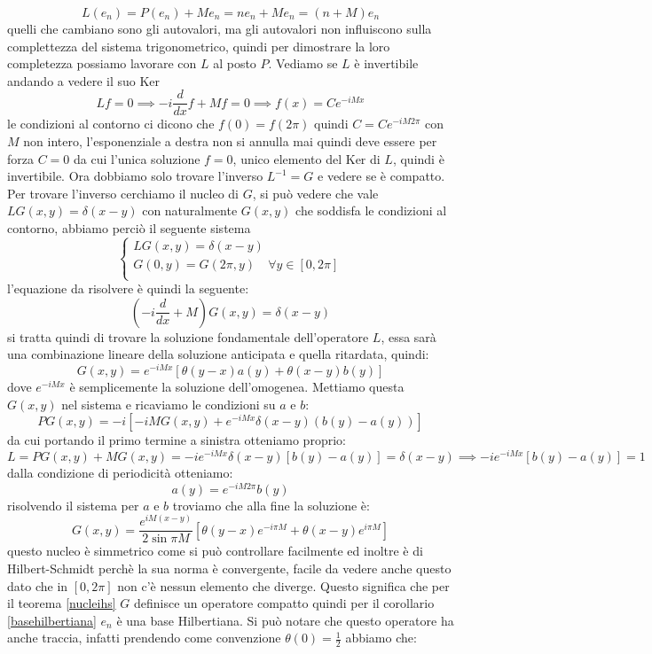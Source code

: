 \documentclass[12pt]{book}
\theoremstyle{plain}
\theoremstyle{definition}
\theoremstyle{remark}
\begin{document}
\[L(e_n) = P(e_n) + Me_n = n e_n +Me_n = (n+M)e_n\]
quelli che cambiano sono gli autovalori, ma gli autovalori non influiscono sulla complettezza del sistema trigonometrico, quindi per dimostrare la loro completezza possiamo lavorare con $L$ al posto $P$. Vediamo se $L$ è invertibile andando a vedere il suo Ker
\[Lf = 0 \implies -i\frac{d}{dx}f+Mf = 0 \implies f(x) = Ce^{-iMx}\]
le condizioni al contorno ci dicono che $f(0)=f(2\pi)$ quindi $C = C e^{-iM2\pi}$ con $M$ non intero, l'esponenziale a destra non si annulla mai quindi deve essere per forza $C=0$ da cui l'unica soluzione $f=0$, unico elemento del Ker di $L$, quindi è invertibile. Ora dobbiamo solo trovare l'inverso $L^{-1} = G$ e vedere se è compatto. Per trovare l'inverso cerchiamo il nucleo di $G$, si può vedere che vale $LG(x,y) = \delta(x-y)$ con naturalmente $G(x,y)$ che soddisfa le condizioni al contorno, abbiamo perciò il seguente sistema
\[ \begin{cases}
    LG(x,y) = \delta(x-y)\\
    G(0,y) = G(2\pi,y) \quad \forall y\in[0,2\pi]\\
  \end{cases}\]
l'equazione da risolvere è quindi la seguente:
\[\left(-i\frac{d}{dx}+M\right)G(x,y) = \delta(x-y)\]
si tratta quindi di trovare la soluzione fondamentale dell'operatore $L$, essa sarà una combinazione lineare della soluzione anticipata e quella ritardata, quindi:
\[G(x,y) = e^{-iM x}[\theta(y-x)a(y) + \theta(x-y)b(y)]\]
dove $e^{-iM x}$ è semplicemente la soluzione dell'omogenea. Mettiamo questa $G(x,y)$ nel sistema e ricaviamo le condizioni su $a$ e $b$:
\[PG(x,y) = -i[-iMG(x,y) + e^{-iMx}\delta(x-y)(b(y)-a(y))]\]
da cui portando il primo termine a sinistra otteniamo proprio:
\[L = PG(x,y) +MG(x,y) = -i e^{-iMx}\delta(x-y)[b(y)-a(y)] = \delta(x-y) \implies -i e^{-iMx}[b(y)-a(y)] = 1\]
dalla condizione di periodicità otteniamo:
\[a(y) = e^{-iM2\pi}b(y)\]
risolvendo il sistema per $a$ e $b$ troviamo che alla fine la soluzione è:
\[G(x,y) = \frac{e^{iM(x-y)}}{2\sin \pi M}[\theta(y-x)e^{-i\pi M} + \theta(x-y)e^{i\pi M}]\]
questo nucleo è simmetrico come si può controllare facilmente ed inoltre è di Hilbert-Schmidt perchè la sua norma è convergente, facile da vedere anche questo dato che in $[0,2\pi]$ non c'è nessun elemento che diverge. Questo significa che per il teorema \eqref{nucleihs} $G$ definisce un operatore compatto quindi
per il corollario \eqref{basehilbertiana} $e_n$ è una base Hilbertiana. Si può notare che questo operatore ha anche traccia, infatti prendendo come convenzione $\theta(0) = \frac{1}{2}$ abbiamo che:
\end{document}
